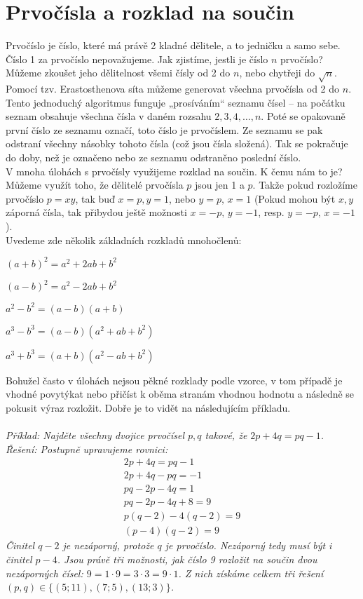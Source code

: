\documentclass[12pt,a4paper]{report}
\begin{document}
\section{Prvočísla a rozklad na součin}
Prvočíslo je číslo, které má právě 2 kladné dělitele, a to jedničku a samo sebe. Číslo 1 za prvočíslo nepovažujeme. Jak zjistíme, jestli je číslo $n$ prvočíslo? Můžeme zkoušet jeho dělitelnost všemi čísly od 2 do $n$, nebo chytřeji do $\sqrt{n}$. 
\\Pomocí tzv. Erastosthenova síta můžeme generovat všechna prvočísla od 2 do $n$. Tento jednoduchý algoritmus funguje „prosíváním“ seznamu čísel – na počátku seznam obsahuje všechna čísla v daném rozsahu $2, 3, 4, \ldots, n$. Poté se opakovaně první číslo ze seznamu označí, toto číslo je prvočíslem. Ze seznamu se pak odstraní všechny násobky tohoto čísla (což jsou čísla složená). Tak se pokračuje do doby, než je označeno nebo  ze seznamu odstraněno poslední číslo. 
\\ V mnoha úlohách s prvočísly využijeme rozklad na součin. K čemu nám to je? Můžeme využít toho, že dělitelé prvočísla $p$ jsou jen 1 a $p$. Takže pokud rozložíme prvočíslo $p=xy$, tak buď $x=p,y=1$, nebo $y=p,\,x=1$ (Pokud mohou být $x,y$ záporná čísla, tak přibydou ještě možnosti $x=-p,\,y=-1$, resp. $y=-p,\,x=-1$).
\\Uvedeme zde několik základních rozkladů mnohočlenů: 
\begin{description}
	\item $(a+b)^2=a^2+2ab+b^2$
	\item $(a-b)^2=a^2-2ab+b^2$
	\item $a^2-b^2=(a-b)(a+b)$
	\item $a^3-b^3=(a-b)(a^2+ab+b^2)$
	\item $a^3+b^3=(a+b)(a^2-ab+b^2)$
\end{description}
Bohužel často v úlohách nejsou pěkné rozklady podle vzorce, v tom případě je vhodné povytýkat nebo přičíst k oběma stranám vhodnou hodnotu a následně se pokusit výraz rozložit. Dobře je to vidět na následujícím příkladu.
\\\\ \textit{Příklad: Najděte všechny dvojice prvočísel $p, q$ takové, že $2p + 4q = pq - 1$.
	\\Řešení: Postupně upravujeme rovnici:
	\begin{align*}
	2p + 4q = pq - 1\\
	2p+4q-pq=-1\\
	pq-2p-4q=1\\
	pq-2p-4q+8=9\\
	p(q-2)-4(q-2)=9\\
	(p-4)(q-2)=9
	\end{align*} 
	Činitel $q - 2$ je nezáporný, protože $q$ je prvočíslo. Nezáporný tedy musí být i činitel $p - 4$. Jsou právě tři možnosti, jak číslo 9 rozložit na součin dvou nezáporných čísel: $9=1\cdot9=3\cdot3=9\cdot 1$. Z nich získáme celkem tři řešení $(p, q) \in \{(5; 11),(7; 5),(13; 3)\}$.}
\end{document}
